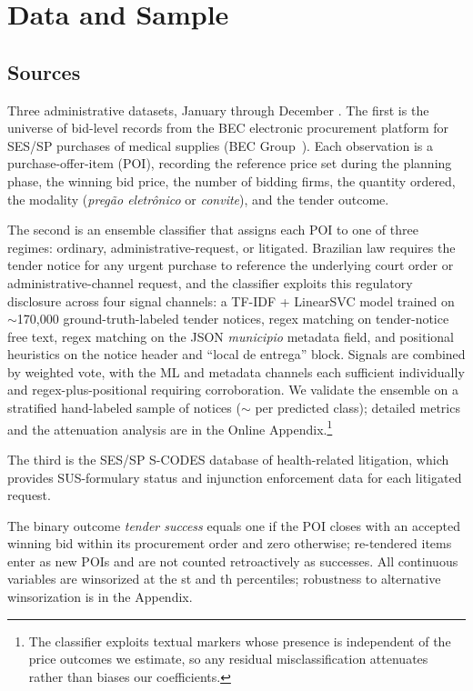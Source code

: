 \section{Data and Sample}
\label{sec:data}

\subsection{Sources}

Three administrative datasets, January \BPsampleStartYear{} through
December \BPsampleEndYear. The first is the universe of bid-level
records from the BEC electronic procurement platform for SES/SP
purchases of medical supplies (BEC Group~\BPbecGroup). Each
observation is a purchase-offer-item (POI), recording the reference
price set during the planning phase, the winning bid price, the
number of bidding firms, the quantity ordered, the modality
(\textit{preg\~ao eletr\^onico} or \textit{convite}), and the
tender outcome.

The second is an ensemble classifier that assigns each POI to one
of three regimes: ordinary, administrative-request, or litigated.
Brazilian law requires the tender notice for any urgent purchase to
reference the underlying court order or administrative-channel
request, and the classifier exploits this regulatory disclosure
across four signal channels: a TF-IDF + LinearSVC model trained on
$\sim$170{,}000 ground-truth-labeled tender notices, regex matching
on tender-notice free text, regex matching on the JSON \textit{municipio}
metadata field, and positional heuristics on the notice header and
``local de entrega'' block. Signals are combined by weighted vote,
with the ML and metadata channels each sufficient individually and
regex-plus-positional requiring corroboration. We validate the
ensemble on a stratified hand-labeled sample of \BPregexNotices{}
notices ($\sim$\BPregexPerClass{} per predicted class); detailed
metrics and the attenuation analysis are in the Online
Appendix.\footnote{The classifier exploits textual markers whose
presence is independent of the price outcomes we estimate, so any
residual misclassification attenuates rather than biases our
coefficients.}

The third is the SES/SP S-CODES database of health-related
litigation, which provides SUS-formulary status and injunction
enforcement data for each litigated request.

The binary outcome \emph{tender success} equals one if the POI
closes with an accepted winning bid within its procurement order and
zero otherwise; re-tendered items enter as new POIs and are not
counted retroactively as successes. All continuous variables are
winsorized at the \BPwinsorLow{}st and \BPwinsorHigh{}th
percentiles; robustness to alternative winsorization is in the
Appendix.

